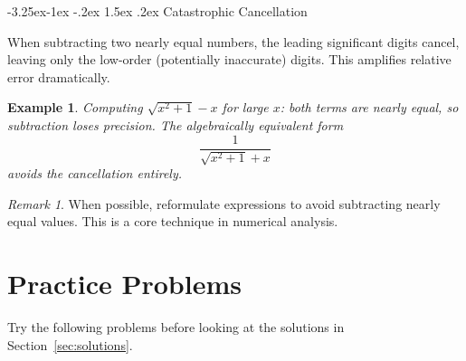 \documentclass{article}
\makeatletter
\newtheorem{example}{Example}[section]
\theoremstyle{remark}
\newtheorem*{remark}{Remark}
\newlength{\subsecindent}
\renewcommand\subsection{\@startsection{subsection}{2}{\subsecindent}%
  {-3.25ex\@plus -1ex \@minus -.2ex}%
  {1.5ex \@plus .2ex}%
  {\normalfont\large\bfseries}}
\newenvironment{sub}{%
  \begin{list}{}{%
    \setlength{\leftmargin}{4em}%
    \setlength{\rightmargin}{0pt}%
    \setlength{\topsep}{0pt}%
    \setlength{\partopsep}{0pt}%
    \setlength{\parsep}{\parskip}%
    \setlength{\itemsep}{\parskip}%
  }\item\relax
}{\end{list}}
\newenvironment{secbody}{%
  \begin{list}{}{%
    \setlength{\leftmargin}{\subsecindent}%
    \setlength{\rightmargin}{0pt}%
    \setlength{\topsep}{0pt}%
    \setlength{\partopsep}{0pt}%
    \setlength{\parsep}{\parskip}%
    \setlength{\itemsep}{\parskip}%
  }\item\relax
}{\end{list}}
\makeatother
\begin{document}
\subsection{Catastrophic Cancellation}
\begin{sub}
When subtracting two nearly equal numbers, the leading significant digits
cancel, leaving only the low-order (potentially inaccurate) digits.  This
amplifies relative error dramatically.

\begin{example}
Computing $\sqrt{x^2+1} - x$ for large $x$: both terms are nearly equal, so
subtraction loses precision.  The algebraically equivalent form
\[
  \frac{1}{\sqrt{x^2+1} + x}
\]
avoids the cancellation entirely.
\end{example}

\begin{remark}
When possible, reformulate expressions to avoid subtracting nearly equal
values.  This is a core technique in numerical analysis.
\end{remark}
\end{sub}

\newpage
\section{Practice Problems}

\begin{secbody}
Try the following problems before looking at the solutions in
Section~\ref{sec:solutions}.
\end{secbody}
\end{document}
